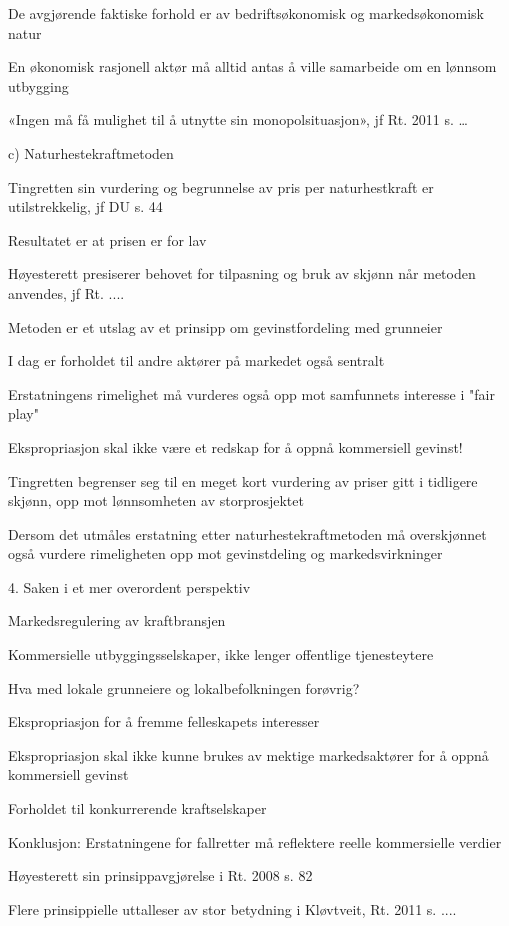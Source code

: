 \documentclass[12pt,a4paper]{article} %
\begin{document}
	De avgjørende faktiske forhold er av bedriftsøkonomisk og markedsøkonomisk natur
	
	En økonomisk rasjonell aktør må alltid antas å ville samarbeide om en lønnsom utbygging

	«Ingen må få mulighet til å utnytte sin monopolsituasjon», jf Rt. 2011 s. …

c)	Naturhestekraftmetoden

	Tingretten sin vurdering og begrunnelse av pris per naturhestkraft er utilstrekkelig, jf DU s. 44

	Resultatet er at prisen er for lav

	Høyesterett presiserer behovet for tilpasning og bruk av skjønn når metoden anvendes, jf Rt. ....

	Metoden er et utslag av et prinsipp om gevinstfordeling med grunneier
	
	I dag er forholdet til andre aktører på markedet også sentralt 

	Erstatningens rimelighet må vurderes også opp mot samfunnets interesse i "fair play"

	Ekspropriasjon skal ikke være et redskap for å oppnå kommersiell gevinst!	
	
	Tingretten begrenser seg til en meget kort vurdering av priser gitt i tidligere skjønn, opp mot lønnsomheten av storprosjektet

	Dersom det utmåles erstatning etter naturhestekraftmetoden må overskjønnet også vurdere rimeligheten opp mot gevinstdeling og markedsvirkninger

4.	Saken i et mer overordent perspektiv

	Markedsregulering av kraftbransjen

	Kommersielle utbyggingsselskaper, ikke lenger offentlige tjenesteytere

	Hva med lokale grunneiere og lokalbefolkningen forøvrig?

	Ekspropriasjon for å fremme felleskapets interesser 

	Ekspropriasjon skal ikke kunne brukes av mektige markedsaktører for å oppnå kommersiell gevinst

	Forholdet til konkurrerende kraftselskaper

	Konklusjon: Erstatningene for fallretter må reflektere reelle kommersielle verdier

	Høyesterett sin prinsippavgjørelse i Rt. 2008 s. 82	

	Flere prinsippielle uttalleser av stor betydning i Kløvtveit, Rt. 2011 s. ....
\end{document}
